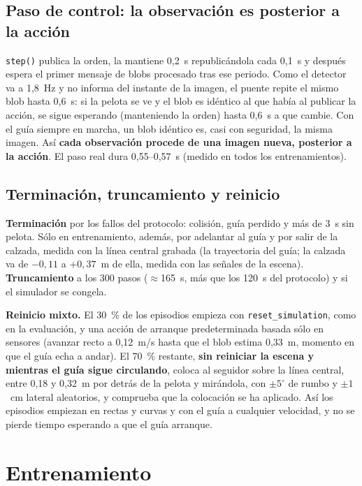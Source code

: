 \documentclass[11pt,a4paper]{article}
\newcommand{\cod}[1]{\texttt{\small #1}}
\begin{document}
\subsection{Paso de control: la observación es posterior a la acción}\label{sec:paso}
\cod{step()} publica la orden, la mantiene 0,2~s republicándola cada 0,1~s y después espera el primer mensaje de
blobs procesado tras ese periodo. Como el detector va a 1,8~Hz y no informa del instante de la imagen, el
puente repite el mismo blob hasta 0,6~s: si la pelota se ve y el blob es idéntico al que había al publicar la
acción, se sigue esperando (manteniendo la orden) hasta 0,6~s a que cambie. Con el guía siempre en marcha, un
blob idéntico es, casi con seguridad, la misma imagen. Así \textbf{cada observación procede de una imagen nueva,
posterior a la acción}. El paso real dura 0,55--0,57~s (medido en todos los entrenamientos).

\subsection{Terminación, truncamiento y reinicio}
\textbf{Terminación} por los fallos del protocolo: colisión, guía perdido y más de 3~s sin pelota. Sólo en
entrenamiento, además, por adelantar al guía y por salir de la calzada, medida con la línea central grabada
(la trayectoria del guía; la calzada va de $-0{,}11$ a $+0{,}37$~m de ella, medida con las señales de la
escena). \textbf{Truncamiento} a los 300 pasos ($\approx$165~s, más que los 120~s del protocolo) y si el
simulador se congela.

\textbf{Reinicio mixto.} El 30~\% de los episodios empieza con \cod{reset\_simulation}, como en la evaluación,
y una acción de arranque predeterminada basada sólo en sensores (avanzar recto a 0,12~m/s hasta que el blob
estima 0,33~m, momento en que el guía echa a andar). El 70~\% restante, \textbf{sin reiniciar la escena y
mientras el guía sigue circulando}, coloca al seguidor sobre la línea central, entre 0,18 y 0,32~m por detrás
de la pelota y mirándola, con $\pm5^{\circ}$ de rumbo y $\pm1$~cm lateral aleatorios, y comprueba que la colocación
se ha aplicado. Así los episodios empiezan en rectas y curvas y con el guía a cualquier velocidad, y no se pierde
tiempo esperando a que el guía arranque.

\section{Entrenamiento}
\end{document}
